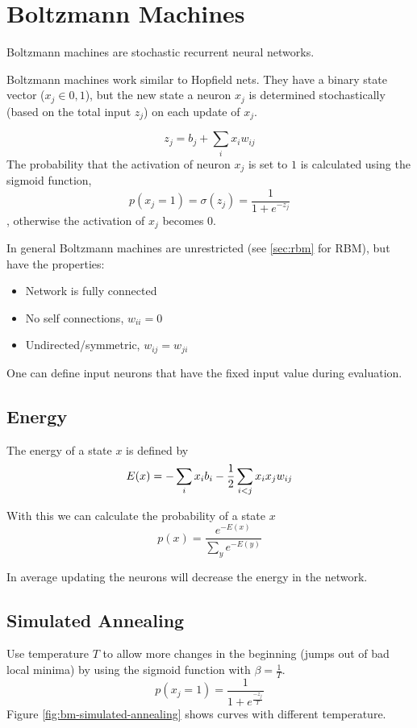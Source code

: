 \section{Boltzmann Machines}\label{sec:bm}
Boltzmann machines are stochastic recurrent neural networks.

Boltzmann machines work similar to Hopfield nets. They have a binary state vector ($x_j \in {0,1}$), but the new state a neuron $x_j$ is determined stochastically (based on the total input $z_j$) on each update of $x_j$.

\begin{equation}
z_j = b_j + \sum_i x_i w_{ij}
\end{equation}
The probability that the activation of neuron $x_j$ is set to $1$ is calculated using the sigmoid function,
\begin{equation}
p(x_j = 1) = \sigma(z_j) = \frac{1}{1 + e^{-z_j}}
\end{equation}
, otherwise the activation of $x_j$ becomes $0$.

In general Boltzmann machines are unrestricted (see \ref{sec:rbm} for \gls{RBM}), but have the properties:
\begin{itemize}
\item Network is fully connected
\item No self connections, $w_{ii}=0$
\item Undirected/symmetric, $w_{ij}=w_{ji}$
\end{itemize}

One can define input neurons that have the fixed input value during evaluation.

\subsection{Energy}
The energy of a state $x$ is defined by
\begin{equation}
E(x) = - \sum_i x_i b_i - \frac{1}{2} \sum_{i<j} x_i x_j w_{ij}
\end{equation}

With this we can calculate the probability of a state $x$
\begin{equation}
p(x) = \frac{e^{-E(x)}}{\sum_y e^{-E(y)}}
\end{equation}

In average updating the neurons will decrease the energy in the network.

\subsection{Simulated Annealing}
Use temperature $T$ to allow more changes in the beginning (\eg jumps out of bad local minima) by using the sigmoid function with $\beta=\frac{1}{T}$.
\begin{equation}
p(x_j = 1) = \frac{1}{1 + e^{\frac{-z_j}{T}}}
\end{equation}
Figure \ref{fig:bm-simulated-annealing} shows curves with different temperature.

